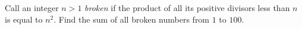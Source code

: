 Call an integer $n>1$ \emph{broken} if the product of all its positive divisors less than $n$ is equal to $n^2$. Find the sum of all broken numbers from $1$ to $100$.
